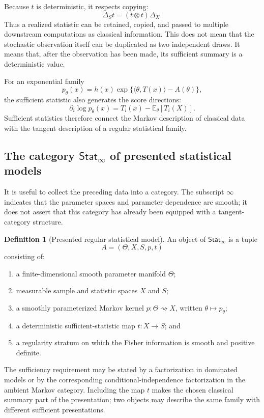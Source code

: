 \documentclass{article}
\theoremstyle{plain}
\theoremstyle{definition}
\newtheorem{definition}[theorem]{Definition}
\theoremstyle{remark}
\newcommand{\StatInf}{\mathsf{Stat}_{\infty}}
\begin{document}
Because \(t\) is deterministic, it respects copying:
\[
  \Delta_S t=(t\otimes t)\Delta_X.
\]
Thus a realized statistic can be retained, copied, and passed to multiple
downstream computations as classical information.  This does not mean that
the stochastic observation itself can be duplicated as two independent draws.
It means that, after the observation has been made, its sufficient summary is
a deterministic value.

For an exponential family
\[
  p_\theta(x)
  =
  h(x)\exp\{\langle\theta,T(x)\rangle-A(\theta)\},
\]
the sufficient statistic also generates the score directions:
\[
  \partial_i\log p_\theta(x)
  =
  T_i(x)-\mathbb E_\theta[T_i(X)].
\]
Sufficient statistics therefore connect the Markov description of classical
data with the tangent description of a regular statistical family.

\subsection{The category
\texorpdfstring{\(\StatInf\)}{Stat-infinity} of presented statistical models}
\label{sec:statinf}

It is useful to collect the preceding data into a category.  The subscript
\(\infty\) indicates that the parameter spaces and parameter dependence are
smooth; it does not assert that this category has already been equipped with a
tangent-category structure.

\begin{definition}[Presented regular statistical model]
\label{def:statinf-object}
An object of \(\StatInf\) is a tuple
\[
  A=(\Theta,X,S,p,t)
\]
consisting of:
\begin{enumerate}[leftmargin=*,itemsep=2pt]
  \item a finite-dimensional smooth parameter manifold \(\Theta\);
  \item measurable sample and statistic spaces \(X\) and \(S\);
  \item a smoothly parameterized Markov kernel
        \(p:\Theta\rightsquigarrow X\), written
        \(\theta\mapsto p_\theta\);
  \item a deterministic sufficient-statistic map \(t:X\to S\); and
  \item a regularity stratum on which the Fisher information is smooth and
        positive definite.
\end{enumerate}
\end{definition}

The sufficiency requirement may be stated by a factorization in dominated
models or by the corresponding conditional-independence factorization in the
ambient Markov category.  Including the map \(t\) makes the chosen classical
summary part of the presentation; two objects may describe the same family
with different sufficient presentations.
\end{document}
